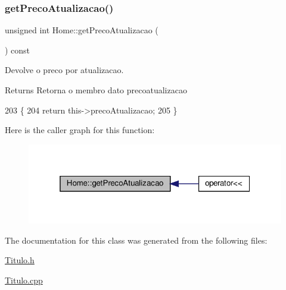 \subsubsection{\texorpdfstring{get\+Preco\+Atualizacao()}{getPrecoAtualizacao()}}
{\footnotesize\ttfamily unsigned int Home\+::get\+Preco\+Atualizacao (\begin{DoxyParamCaption}{ }\end{DoxyParamCaption}) const}



Devolve o preco por atualizacao. 

\begin{DoxyReturn}{Returns}
Retorna o membro dato precoatualizacao 
\end{DoxyReturn}

\begin{DoxyCode}
203  \{
204     \textcolor{keywordflow}{return} this->precoAtualizacao;
205  \}
\end{DoxyCode}
Here is the caller graph for this function\+:
\nopagebreak
\begin{figure}[H]
\begin{center}
\leavevmode
\includegraphics[width=319pt]{classHome_a52f37198fb17a321dbcac93d1c35b537_icgraph}
\end{center}
\end{figure}


The documentation for this class was generated from the following files\+:\begin{DoxyCompactItemize}
\item 
\hyperlink{Titulo_8h}{Titulo.\+h}\item 
\hyperlink{Titulo_8cpp}{Titulo.\+cpp}\end{DoxyCompactItemize}
